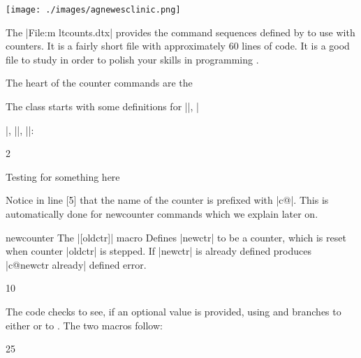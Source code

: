 \thispagestyle{plain}
{\centering\texttt{[image: ./images/agnewesclinic.png]}\par}

{\centering {}\par}


The |File:m ltcounts.dtx| provides the command sequences defined by \latex to use with counters. It is a fairly short file with approximately 
60 lines of code. It is a good file to study in order to polish your skills in programming \tex. 

The heart of the counter commands are the 

The class starts with some definitions for |\setcounter|, |\addtocounter|, |\newcounter|, |\value|:


\begin{teXXX}
2 \def\setcounter#1#2{%
3   \@ifundefined{c@#1}%
4      {\@nocounterr{#1}}%
5      {\global\csname c@#1\endcsname#2\relax}}
\end{teXXX}


Testing for something here

Notice in line [5] that the name of the counter is prefixed with |c@|. This is automatically done for newcounter commands which we explain later on.



\begin{docCommand}{newcounter}{}
The |[oldctr]| macro  Defines |newctr| to be a counter, which is
reset when counter |oldctr|  is stepped. If |newctr| is  already defined produces
|c@newctr already| defined  error.
\end{docCommand}

\begin{teXXX}
10 \def\newcounter#1{%
11   \expandafter\@ifdefinable \csname c@#1\endcsname
12   {\@definecounter{#1}}%
13   \@ifnextchar[{\@newctr{#1}}{}}
\end{teXXX}

The code checks to see, if an optional value is provided, using  and branches to either
 or to . The two macros follow:

\begin{teXXX}
25 \def\@definecounter#1{\expandafter\newcount\csname c@#1\endcsname
26   \setcounter{#1}\z@
27   \global\expandafter\let\csname cl@#1\endcsname\@empty
28   \@addtoreset{#1}{@ckpt}%
29   \global\expandafter\let\csname p@#1\endcsname\@empty
30   \expandafter
31   \gdef\csname the#1\expandafter\endcsname\expandafter
32       {\expandafter\@arabic\csname c@#1\endcsname}
}
\end{teXXX}

